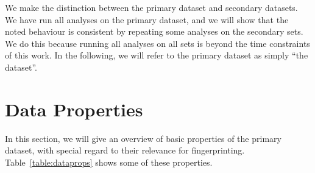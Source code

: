 \documentclass[
    fontsize=12pt,
    headings=small,
    parskip=half,
    bibliography=totoc,
    numbers=noenddot,
    open=any
    ]{scrreprt}
\begin{document}
We make the distinction between the primary dataset and secondary datasets.
We have run all analyses on the primary dataset, and we will show
that the noted behaviour is consistent by repeating some analyses
on the secondary sets.
We do this because running all analyses on all sets is beyond the time
constraints of this work.
In the following, we will refer to the primary dataset as simply ``the dataset''.

\section{Data Properties}
\label{section:data_properties}
In this section, we will give an overview of basic properties of the primary dataset,
with special regard to their relevance for fingerprinting.
Table~\ref{table:dataprops} shows some of these properties.
\end{document}
